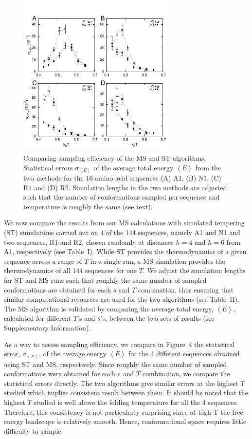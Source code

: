 \documentclass[
aip,
rsi,%
amsmath,amssymb,
reprint,%
]{revtex4-1}
\newcommand	 {\sbar}	{{s}}
\newcommand {\sigE}	{{\sigma_{\left < E \right >}}}
\begin{document}
\begin{figure}
\includegraphics[width=8.0cm]{Stderr}
\caption{Comparing sampling efficiency of the MS and ST algorithms. Statistical errors $\sigma_{\left < E\right >}$ of the average total energy $\left < E\right >$ from the two methods for the 16-amino acid sequences (A) A1, (B) N1, (C) R1 and (D) R2. Simulation lengths in the two methods are adjusted such that the number of conformations sampled per sequence and temperature is roughly the same (see text). }
\end{figure}

We now compare the results from our MS calculations with simulated tempering (ST) simulations carried out on 4 of the 144 sequences, namely A1 and N1 and two sequences, R1 and R2, chosen randomly at distances $h=4$ and $h=6$ from A1, respectively (see Table~I). While ST provides the thermodynamics of a given sequence across a range of $T$ in a single run, a MS simulation provides the thermodynamics of all 144 sequences for one $T$. We adjust the simulation lengths for ST and MS runs such that roughly the same number of sampled conformations are obtained for each $\sbar$ and $T$ combination, thus ensuring that similar computational resources are used for the two algorithms (see Table~II). The MS algorithm is validated by comparing the average total energy, $\left < E \right >$, calculated for different $T$'s and $\sbar$'s, between the two sets of results (see Supplementary Information). 

As a way to assess sampling efficiency, we compare in Figure~4 the statistical error, $\sigE$, of the average energy $\left <E\right >$ for the 4 different sequences obtained using ST and MS, respectively. Since roughly the same number of sampled conformations were obtained for each $\sbar$ and $T$ combination, we compare the statistical errors directly. The two algorithms give similar errors at the highest $T$ studied which implies consistent result between them. It should be noted that the highest $T$ studied is well above the folding temperature for all the 4 sequences. Therefore, this consistency is not particularly surprising since at high-T the free-energy landscape is relatively smooth. Hence, conformational space requires little difficulty to sample.
\end{document}
